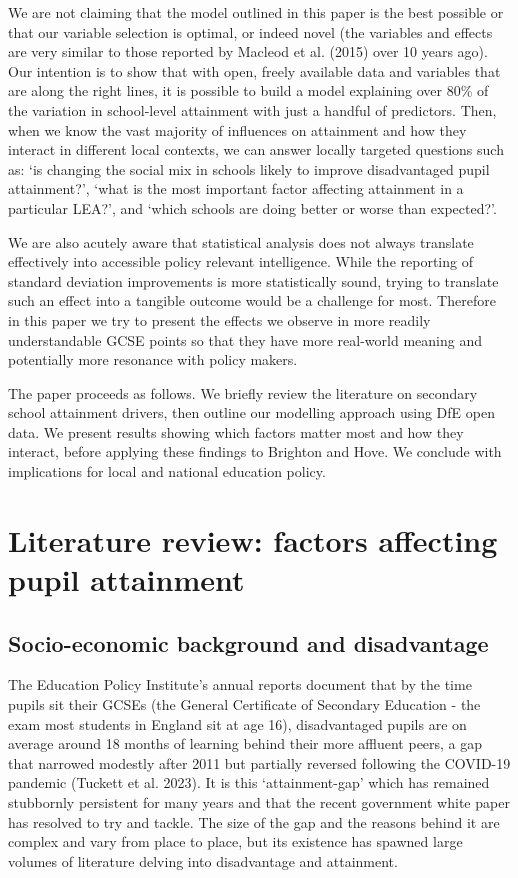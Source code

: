 \documentclass[
  12pt,
  titlepage]{article}
\begin{document}
We are not claiming that the model outlined in this paper is the best
possible or that our variable selection is optimal, or indeed novel (the
variables and effects are very similar to those reported by Macleod et
al. (2015) over 10 years ago). Our intention is to show that with open,
freely available data and variables that are along the right lines, it
is possible to build a model explaining over 80\% of the variation in
school-level attainment with just a handful of predictors. Then, when we
know the vast majority of influences on attainment and how they interact
in different local contexts, we can answer locally targeted questions
such as: `is changing the social mix in schools likely to improve
disadvantaged pupil attainment?', `what is the most important factor
affecting attainment in a particular LEA?', and `which schools are doing
better or worse than expected?'.

We are also acutely aware that statistical analysis does not always
translate effectively into accessible policy relevant intelligence.
While the reporting of standard deviation improvements is more
statistically sound, trying to translate such an effect into a tangible
outcome would be a challenge for most. Therefore in this paper we try to
present the effects we observe in more readily understandable GCSE
points so that they have more real-world meaning and potentially more
resonance with policy makers.

The paper proceeds as follows. We briefly review the literature on
secondary school attainment drivers, then outline our modelling approach
using DfE open data. We present results showing which factors matter
most and how they interact, before applying these findings to Brighton
and Hove. We conclude with implications for local and national education
policy.

\section{Literature review: factors affecting pupil
attainment}\label{literature-review-factors-affecting-pupil-attainment}

\subsection{Socio-economic background and
disadvantage}\label{socio-economic-background-and-disadvantage}

The Education Policy Institute's annual reports document that by the
time pupils sit their GCSEs (the General Certificate of Secondary
Education - the exam most students in England sit at age 16),
disadvantaged pupils are on average around 18 months of learning behind
their more affluent peers, a gap that narrowed modestly after 2011 but
partially reversed following the COVID-19 pandemic (Tuckett et al.
2023). It is this `attainment-gap' which has remained stubbornly
persistent for many years and that the recent government white paper has
resolved to try and tackle. The size of the gap and the reasons behind
it are complex and vary from place to place, but its existence has
spawned large volumes of literature delving into disadvantage and
attainment.
\end{document}
